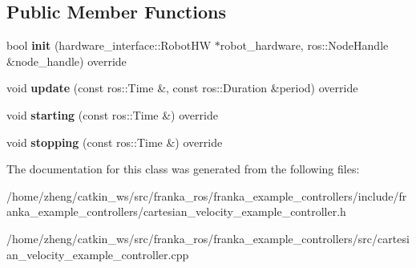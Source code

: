 \subsection*{Public Member Functions}
\begin{DoxyCompactItemize}
\item 
\mbox{\label{classfranka__example__controllers_1_1_cartesian_velocity_example_controller_a74c17e2afdd736f29e0d165362ddc212}} 
bool {\bfseries init} (hardware\+\_\+interface\+::\+Robot\+HW $\ast$robot\+\_\+hardware, ros\+::\+Node\+Handle \&node\+\_\+handle) override
\item 
\mbox{\label{classfranka__example__controllers_1_1_cartesian_velocity_example_controller_ab39ae92f4a9059066d6f18a6dddeb2b3}} 
void {\bfseries update} (const ros\+::\+Time \&, const ros\+::\+Duration \&period) override
\item 
\mbox{\label{classfranka__example__controllers_1_1_cartesian_velocity_example_controller_a9326c6506dc721e03447fef88c5c59f7}} 
void {\bfseries starting} (const ros\+::\+Time \&) override
\item 
\mbox{\label{classfranka__example__controllers_1_1_cartesian_velocity_example_controller_a03ffcb4dd32fa51329f7600384ff22d6}} 
void {\bfseries stopping} (const ros\+::\+Time \&) override
\end{DoxyCompactItemize}


The documentation for this class was generated from the following files\+:\begin{DoxyCompactItemize}
\item 
/home/zheng/catkin\+\_\+ws/src/franka\+\_\+ros/franka\+\_\+example\+\_\+controllers/include/franka\+\_\+example\+\_\+controllers/cartesian\+\_\+velocity\+\_\+example\+\_\+controller.\+h\item 
/home/zheng/catkin\+\_\+ws/src/franka\+\_\+ros/franka\+\_\+example\+\_\+controllers/src/cartesian\+\_\+velocity\+\_\+example\+\_\+controller.\+cpp\end{DoxyCompactItemize}
